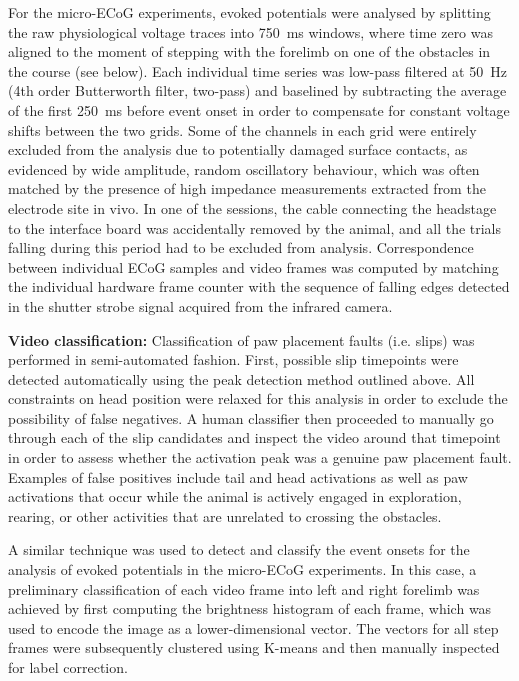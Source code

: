 For the micro-ECoG experiments, evoked potentials were analysed by splitting the raw physiological voltage traces into \SI{750}{\milli\second} windows, where time zero was aligned to the moment of stepping with the forelimb on one of the obstacles in the course (see below). Each individual time series was low-pass filtered at \SI{50}{\hertz} (4th order Butterworth filter, two-pass) and baselined by subtracting the average of the first \SI{250}{\milli\second} before event onset in order to compensate for constant voltage shifts between the two grids. Some of the channels in each grid were entirely excluded from the analysis due to potentially damaged surface contacts, as evidenced by wide amplitude, random oscillatory behaviour, which was often matched by the presence of high impedance measurements extracted from the electrode site in vivo. In one of the sessions, the cable connecting the headstage to the interface board was accidentally removed by the animal, and all the trials falling during this period had to be excluded from analysis. Correspondence between individual ECoG samples and video frames was computed by matching the individual hardware frame counter with the sequence of falling edges detected in the shutter strobe signal acquired from the infrared camera.

\textbf{Video classification:} Classification of paw placement faults (i.e. slips) was performed in semi-automated fashion. First, possible slip timepoints were detected automatically using the peak detection method outlined above. All constraints on head position were relaxed for this analysis in order to exclude the possibility of false negatives. A human classifier then proceeded to manually go through each of the slip candidates and inspect the video around that timepoint in order to assess whether the activation peak was a genuine paw placement fault. Examples of false positives include tail and head activations as well as paw activations that occur while the animal is actively engaged in exploration, rearing, or other activities that are unrelated to crossing the obstacles.

A similar technique was used to detect and classify the event onsets for the analysis of evoked potentials in the micro-ECoG experiments. In this case, a preliminary classification of each video frame into left and right forelimb was achieved by first computing the brightness histogram of each frame, which was used to encode the image as a lower-dimensional vector. The vectors for all step frames were subsequently clustered using K-means and then manually inspected for label correction.

